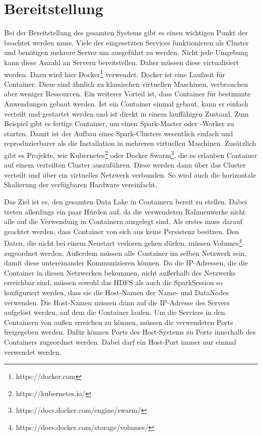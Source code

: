 \section{Bereitstellung}

Bei der Bereitstellung des gesamten Systems gibt es einen wichtigen Punkt der beachtet werden muss.
Viele der eingesetzten Services funktionieren als Cluster und benötigen mehrere Server um ausgeführt zu werden.
Nicht jede Umgebung kann diese Anzahl an Servern bereitstellen.
Daher müssen diese virtualisiert werden.
Dazu wird hier Docker\footnote{https://docker.com} verwendet.
Docker ist eine Laufzeit für Container.
Diese sind ähnlich zu klassischen virtuellen Maschinen, verbrauchen aber weniger Ressourcen.
Ein weiterer Vorteil ist, dass Container für bestimmte Anwendungen gebaut werden.
Ist ein Container einmal gebaut, kann er einfach verteilt und gestartet werden und ist direkt in einem lauffähigen Zustand.
Zum Beispiel gibt es fertige Container, um einen Spark-Master oder -Worker zu starten.
Damit ist der Aufbau eines Spark-Clusters wesentlich einfach und reproduzierbarer als die Installation in mehreren virtuellen Maschinen.
Zusätzlich gibt es Projekte, wie Kubernetes\footnote{https://kubernetes.io/} oder Docker Swarm\footnote{https://docs.docker.com/engine/swarm/}, die es erlauben Container auf einem verteilten Cluster auszuführen.
Diese werden dann über das Cluster verteilt und über ein virtuelles Netzwerk verbunden.
So wird auch die horizontale Skalierung der verfügbaren Hardware vereinfacht.

Das Ziel ist es, den gesamten Data Lake in Containern bereit zu stellen.
Dabei treten allerdings ein paar Hürden auf, da die verwendeten Rahmenwerke nicht alle auf die Verwendung in Containern ausgelegt sind.
Als erstes muss darauf geachtet werden, dass Container von sich aus keine Persistenz besitzen.
Den Daten, die nicht bei einem Neustart verloren gehen dürfen, müssen Volumes\footnote{https://docs.docker.com/storage/volumes/} zugeordnet werden.
Außerdem müssen alle Container im selben Netzwerk sein, damit diese untereinander Kommunizieren können.
Da die IP-Adressen, die die Container in diesen Netzwerken bekommen, nicht außerhalb des Netzwerks erreichbar sind, müssen sowohl das HDFS als auch die SparkSession so konfiguriert werden, dass sie die Host-Namen der Name- und DataNodes verwenden.
Die Host-Namen müssen dann auf die IP-Adresse des Servers aufgelöst werden, auf dem die Container laufen.
Um die Services in den Containern von außen erreichen zu können, müssen die verwendeten Ports freigegeben werden.
Dafür können Ports des Host-Systems zu Ports innerhalb des Containers zugeordnet werden.
Dabei darf ein Host-Port immer nur einmal verwendet werden.


